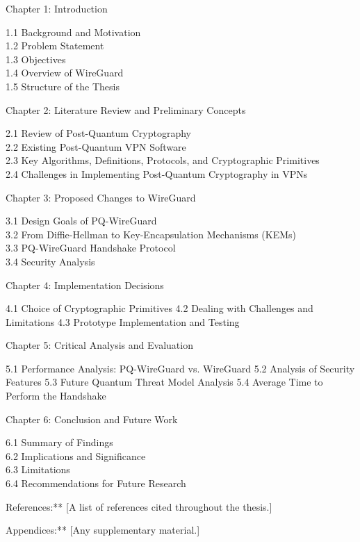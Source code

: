 \begin{description}

\item Chapter 1: Introduction

1.1 Background and Motivation \\
1.2 Problem Statement\\
1.3 Objectives\\
1.4 Overview of WireGuard\\
1.5 Structure of the Thesis

\item Chapter 2: Literature Review and Preliminary Concepts

2.1 Review of Post-Quantum Cryptography\\
2.2 Existing Post-Quantum VPN Software\\
2.3 Key Algorithms, Definitions, Protocols, and Cryptographic Primitives\\
2.4 Challenges in Implementing Post-Quantum Cryptography in VPNs

\item Chapter 3: Proposed Changes to WireGuard

3.1 Design Goals of PQ-WireGuard\\
3.2 From Diffie-Hellman to Key-Encapsulation Mechanisms (KEMs)\\
3.3 PQ-WireGuard Handshake Protocol\\
3.4 Security Analysis

\item Chapter 4: Implementation Decisions

4.1 Choice of Cryptographic Primitives 
4.2 Dealing with Challenges and Limitations 
4.3 Prototype Implementation and Testing

\item Chapter 5: Critical Analysis and Evaluation

5.1 Performance Analysis: PQ-WireGuard vs. WireGuard 
5.2 Analysis of Security Features 
5.3 Future Quantum Threat Model Analysis 
5.4 Average Time to Perform the Handshake

\item Chapter 6: Conclusion and Future Work

6.1 Summary of Findings\\
6.2 Implications and Significance\\
6.3 Limitations\\
6.4 Recommendations for Future Research

\item References:** [A list of references cited throughout the thesis.]

\item Appendices:** [Any supplementary material.]
\end{description}